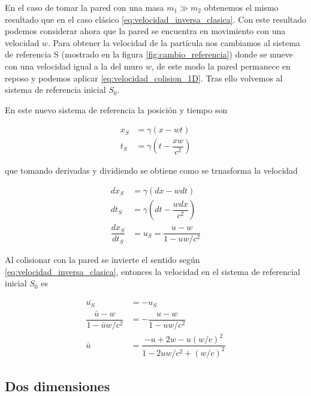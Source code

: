 En el caso de tomar la pared con una masa \( m_1 \gg m_2 \) obtenemos el mismo resultado que en el caso clásico \ref{eq:velocidad_inversa_clasica}. Con este resultado podemos considerar ahora que la pared se encuentra en movimiento con una velocidad \( w \). Para obtener la velocidad de la partícula nos cambiamos al sistema de referencia S (mostrado en la figura \ref{fig:cambio_referencia}) donde se mueve con una velocidad igual a la del muro \( w \), de este modo la pared permanece en reposo y podemos aplicar \ref{eq:velocidad_colision_1D}. Tras ello volvemos al sistema de referencia inicial \( S_0 \).

\vspace{3mm}

En este nuevo sistema de referencia la posición y tiempo son

\begin{align}\label{eq:tiempo_sistema_muro_reposo}
    x_S &= \gamma(x - wt) \\
    t_S &= \gamma(t - \dfrac{xw}{c^2})
\end{align}

que tomando derivadas y dividiendo se obtiene como se trnasforma la velocidad

\begin{align}
    dx_S &= \gamma\left( dx - w dt \right) \nonumber\\
    dt_S &= \gamma \left( dt - \dfrac{w dx}{c^2} \right) \nonumber \\
    \dfrac{dx_S}{dt_S} &= u_S = \dfrac{u - w}{1 - u w/c^2} \label{eq:transformacion_velocidad_1D} 
\end{align}

\vspace{3mm}

Al colisionar con la pared se invierte el sentido según \ref{eq:velocidad_inversa_clasica}, entonces la velocidad en el sistema de referencial inicial \( S_0 \) es

\begin{align}
    \bar{u_S} &= -u_S \nonumber \\
    \dfrac{\bar{u} - w}{1 - \bar{u} w/c^2} &= -\dfrac{u - w}{1 - u w/c^2} \nonumber \\
    \bar{u} &= \dfrac{-u + 2w - u{(w/c)}^2}{1 - 2uw/c^2 + {(w/c)}^2} \label{eq:nueva_velocidad_1D}
\end{align}

\vspace{3mm}

\subsection{Dos dimensiones}

